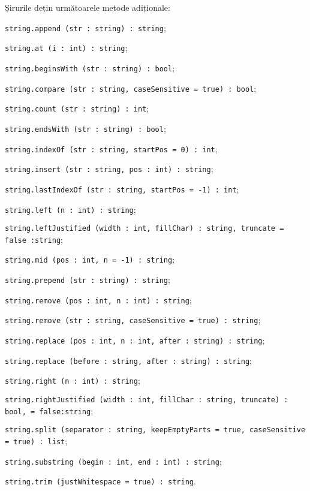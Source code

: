 Șirurile dețin următoarele metode adiționale:
\begin{icItems}
	\item
	\texttt{string.append (str : string) : string};
	\item
	\texttt{string.at (i : int) : string};
	\item
	\texttt{string.beginsWith (str : string) : bool};
	\item
	\texttt{string.compare (str : string, caseSensitive = true) : bool};
	\item
	\texttt{string.count (str : string) : int};
	\item
	\texttt{string.endsWith (str : string) : bool};
	\item
	\texttt{string.indexOf (str : string, startPos = 0) : int};
	\item
	\texttt{string.insert (str : string, pos : int) : string};
	\item
	\texttt{string.lastIndexOf (str : string, startPos = -1) : int};
	\item
	\texttt{string.left (n : int) : string};
	\item
	\texttt{string.leftJustified (width : int, fillChar) : string, truncate = false :string};
	\item
	\texttt{string.mid (pos : int, n = -1) : string};
	\item
	\texttt{string.prepend (str : string) : string};
	\item
	\texttt{string.remove (pos : int, n : int) : string};
	\item
	\texttt{string.remove (str : string, caseSensitive = true) : string};
	\item
	\texttt{string.replace (pos : int, n : int, after : string) : string};
	\item
	\texttt{string.replace (before : string, after : string) : string};
	\item
	\texttt{string.right (n : int) : string};
	\item
	\texttt{string.rightJustified (width : int, fillChar : string, truncate) : bool, = false:string};
	\item
	\texttt{string.split (separator : string, keepEmptyParts = true, caseSensitive = true) : list};
	\item
	\texttt{string.substring (begin : int, end : int) : string};
	\item
	\texttt{string.trim (justWhitespace = true) : string}.
\end{icItems}

